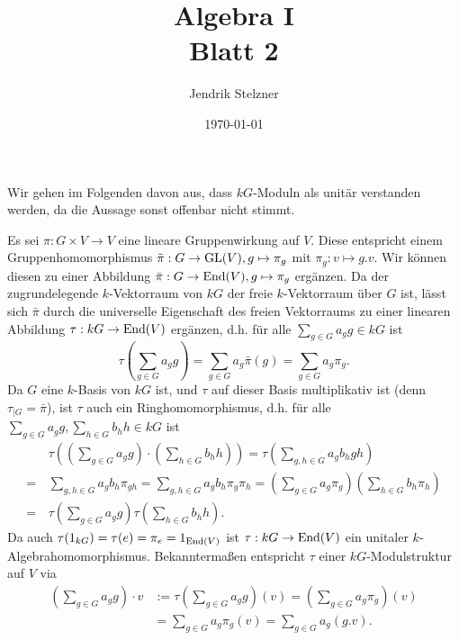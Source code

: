 \documentclass[a4paper,10pt]{article}
\title{\sc Algebra I \\ \Large Blatt 2}
\author{Jendrik Stelzner}
\date{\today}
\begin{document}
\maketitle





\section{}
Wir gehen im Folgenden davon aus, dass $kG$-Moduln als unitär verstanden werden, da die Aussage sonst offenbar nicht stimmt.

Es sei $\pi : G \times V \to V$ eine lineare Gruppenwirkung auf $V$. Diese entspricht einem Gruppenhomomorphismus $\tilde{\pi} : G \to \operatorname{GL}(V), g \mapsto \pi_g$ mit $\pi_g : v \mapsto g.v$. Wir können diesen zu einer Abbildung $\bar{\pi} : G \to \operatorname{End}(V), g \mapsto \pi_g$ ergänzen. Da der zugrundelegende $k$-Vektorraum von $kG$ der freie $k$-Vektorraum über $G$ ist, lässt sich $\bar{\pi}$ durch die universelle Eigenschaft des freien Vektorraums zu einer linearen Abbildung $\tau : kG \to \operatorname{End}(V)$ ergänzen, d.h. für alle $\sum_{g \in G} a_g g \in kG$ ist
\[
 \tau\left( \sum_{g\in G} a_g g\right) = \sum_{g \in G} a_g \bar{\pi}(g) = \sum_{g \in G} a_g \pi_g.
\]
Da $G$ eine $k$-Basis von $kG$ ist, und $\tau$ auf dieser Basis multiplikativ ist (denn $\tau_{|G} = \bar{\pi}$), ist $\tau$ auch ein Ringhomomorphismus, d.h. für alle $\sum_{g \in G} a_g g, \sum_{h \in G} b_h h \in kG$ ist
\begin{align*}
 &\, \tau\left( \left(\sum_{g \in G} a_g g\right) \cdot \left(\sum_{h \in G} b_h h\right) \right)
 = \tau\left( \sum_{g, h \in G} a_g b_h g h \right) \\
 =&\, \sum_{g,h \in G} a_g b_h \pi_{g h}
 = \sum_{g,h \in G} a_g b_h \pi_g \pi_h
 = \left(\sum_{g \in G} a_g \pi_g\right) \left(\sum_{h \in G} b_h \pi_h\right) \\
 =&\, \tau\left(\sum_{g \in G} a_g g\right) \tau\left(\sum_{h \in G} b_h h\right).
\end{align*}
Da auch $\tau(1_{kG}) = \tau(e) = \pi_e = 1_{\operatorname{End}(V)}$ ist $\tau : kG \to \operatorname{End}(V)$ ein unitaler $k$-Algebrahomomorphismus. Bekanntermaßen entspricht $\tau$ einer $kG$-Modulstruktur auf $V$ via
\begin{align*}
 \left(\sum_{g \in G} a_g g\right) \cdot v
 &:= \tau\left(\sum_{g \in G} a_g g\right)(v)
 = \left(\sum_{g \in G} a_g \pi_g\right)(v) \\
 &= \sum_{g \in G} a_g \pi_g(v)
 = \sum_{g \in G} a_g (g.v).
\end{align*}
\end{document}
